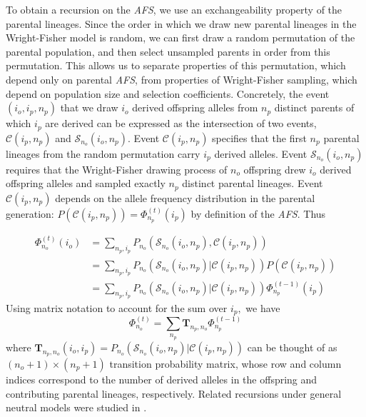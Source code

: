 \documentclass[review,nonatbib]{elsarticle}
\newcommand{\afs}[2]{\Phi_{#1}^{(#2)}}
\begin{document}
To obtain a recursion on the
\textit{AFS}, we use an exchangeability property of the parental lineages. Since the order in which we
draw new parental lineages in the Wright-Fisher model is random, we can first draw a random permutation 
of the parental population, and then select unsampled parents in order from this permutation. 
This allows us to separate properties of this permutation,
which depend only on parental \textit{AFS}, from properties of Wright-Fisher sampling, which depend
on population size and selection coefficients. Concretely, the event $(i_o,i_p,n_p)$ that we draw
$i_o$ derived offspring alleles from $n_p$ distinct parents of which $i_p$ are derived can be
expressed as the intersection of two events, $\mathcal{C}(i_p,n_p)$ and $\mathcal{S}_{n_o}(i_o,
n_p)$. Event $\mathcal{C}(i_p,n_p)$ specifies that the first $n_p$ parental lineages from the random
permutation carry $i_p$ derived alleles. Event $\mathcal{S}_{n_o}(i_o, n_p)$ requires that the
Wright-Fisher drawing process of $n_o$ offspring drew $i_o$ derived offspring alleles and sampled
exactly $n_p$ distinct parental lineages. Event $\mathcal{C}(i_p, n_p)$ depends on the allele
frequency distribution in the parental generation: $P(\mathcal{C}(i_p,n_p)) =\afs{n_p}{t} (i_p)$ by
definition of the \textit{AFS}. Thus

\begin{equation}
  \begin{split}
    \afs{n_o}{t}(i_o)&= \sum_{n_p,i_p} P_{n_o}(\mathcal{S}_{n_o}(i_o, n_p), \mathcal{C}(i_p,n_p) )\\
    &=   \sum_{n_p,i_p} P_{n_o}(\mathcal{S}_{n_o}(i_o, n_p)| \mathcal{C}(i_p,n_p) ) P(\mathcal{C}(i_p,n_p))\\
    &=   \sum_{n_p,i_p} P_{n_o}(\mathcal{S}_{n_o}(i_o, n_p)| \mathcal{C}(i_p,n_p) )  \afs{n_p}{t-1}(i_p)%
  \end{split}
\end{equation}
Using matrix notation to account for the sum over $i_p,$ we have
\begin{equation}
  \afs{n_o}{t} = \sum_{n_p}  \mathbf{T}_{n_p,n_o}     \afs{n_p}{t-1}
    \label{eq_recur}
  \end{equation}
where $\mathbf{T}_{n_p,n_o}(i_o,i_p) = P_{n_o}(\mathcal{S}_{n_o}(i_o, n_p)| \mathcal{C}(i_p,n_p) ) $ 
can be thought of as $(n_o+1) \times (n_p+1)$ transition
probability matrix, whose row and column indices correspond to the number of derived alleles in the
offspring and contributing parental lineages, respectively. Related recursions under general neutral 
models were studied in \cite{lessard2010recurrence}.
\end{document}
